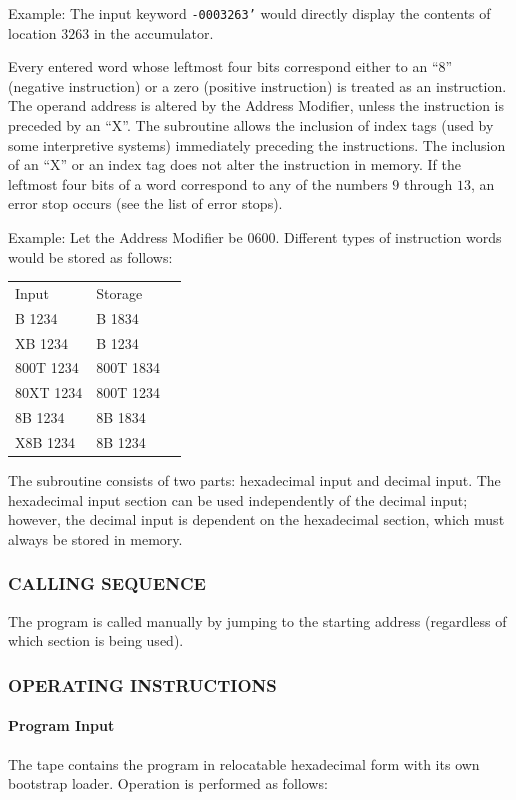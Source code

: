 \begin{itemize}
Example: The input keyword \texttt{-0003263'} would directly display the contents of location $3263$ in the accumulator.

Every entered word whose leftmost four bits correspond either to an ``8'' (negative instruction) or a zero (positive instruction) is treated as an instruction. The operand address is altered by the Address Modifier, unless the instruction is preceded by an ``X''. The subroutine allows the inclusion of index tags (used by some interpretive systems) immediately preceding the instructions. The inclusion of an ``X'' or an index tag does not alter the instruction in memory. If the leftmost four bits of a word correspond to any of the numbers $9$ through $13$, an error stop occurs (see the list of error stops).

Example: Let the Address Modifier be $0600$. Different types of instruction words would be stored as follows:

\begin{tabular}{lll}
Input     &   Storage \\
B 1234    &    B 1834 \\
XB 1234   &    B 1234 \\
800T 1234 &    800T 1834 \\
80XT 1234 &    800T 1234 \\
8B 1234   &    8B 1834 \\
X8B 1234  &    8B 1234 \\
\end{tabular}

The subroutine consists of two parts: hexadecimal input and decimal input. The hexadecimal input section can be used independently of the decimal input; however, the decimal input is dependent on the hexadecimal section, which must always be stored in memory.
\end{itemize}

\subsubsection*{CALLING SEQUENCE}
The program is called manually by jumping to the starting address (regardless of which section is being used).

\subsubsection*{OPERATING INSTRUCTIONS}

\paragraph{Program Input}
The tape contains the program in relocatable hexadecimal form with its own bootstrap loader. Operation is performed as follows:


